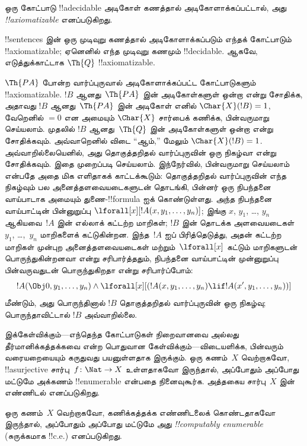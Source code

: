 \documentclass[../../../include/open-logic-section]{subfiles}
\begin{document}
\begin{defn}
ஒரு கோட்பாடு !!a{decidable} அடிகோள் கணத்தால் அடிகோளாக்கப்பட்டால், அது
\emph{!!{axiomatizable}} எனப்படுகிறது.
\end{defn}

\begin{ex}
!!{sentence}s இன் ஒரு முடிவுறு கணத்தால் அடிகோளாக்கப்படும் எந்தக் கோட்பாடும்
!!{axiomatizable}; ஏனெனில் எந்த முடிவுறு கணமும் !!{decidable}. ஆகவே,
எடுத்துக்காட்டாக $\Th{Q}$ !!{axiomatizable}.

$\Th{PA}$ போன்ற வார்ப்புருவால் அடிகோளாக்கப்பட்ட கோட்பாடுகளும்
!!{axiomatizable}. $!B$ ஆனது~$\Th{PA}$ இன் அடிகோள்களுள் ஒன்றா என்று
சோதிக்க, அதாவது $!B$ ஆனது~$\Th{PA}$ இன் அடிகோள் எனில்
$\Char{X}(!B) = 1$, வேறெனில் $= 0$ என அமையும் $\Char{X}$ சார்பைக்
கணிக்க, பின்வருமாறு செய்யலாம். முதலில் $!B$ ஆனது~$\Th{Q}$ இன்
அடிகோள்களுள் ஒன்றா என்று சோதிக்கவும். அவ்வாறெனில் விடை ``ஆம்,'' மேலும்
$\Char{X}(!B) = 1$. அவ்வாறில்லையெனில், அது தொகுத்தறிதல் வார்ப்புருவின்
ஒரு நிகழ்வா என்று சோதிக்கவும். இதை முறைப்படி செய்யலாம். இந்நேர்வில்,
பின்வருமாறு செய்யலாம் என்பதே அதை மிக எளிதாகக் காட்டக்கூடும்: தொகுத்தறிதல்
வார்ப்புருவின் எந்த நிகழ்வும் பல அனைத்தளவையடைகளுடன் தொடங்கி, பின்னர் ஒரு
நிபந்தனை வாய்பாடாக அமையும் துணை-!!{formula} ஐக் கொண்டுள்ளது. அந்த நிபந்தனை
வாய்பாட்டின் பின்னுறுப்பு $\lforall[x][!A(x, y_1, \dots, y_n)]$; இங்கு
$x$, $y_1$, \dots, $y_n$ ஆகியவை~$!A$ இன் எல்லாக் கட்டற்ற மாறிகள்;
$!B$ இன் தொடக்க அளவையடைகள்~$y_1$, \dots,~$y_n$ மாறிகளைக் கட்டுகின்றன.
இந்த~$!A$ ஐப் பிரித்தெடுத்து, அதன் கட்டற்ற மாறிகள் முன்புற அனைத்தளவையடைகள்
மற்றும்~$\lforall[x]$ கட்டும் மாறிகளுடன் பொருந்துகின்றனவா என்று
சரிபார்த்ததும், நிபந்தனை வாய்பாட்டின் முன்னுறுப்பு பின்வருவதுடன் பொருந்துகிறதா
என்று சரிபார்ப்போம்:
\[
!A(\Obj 0, y_1, \dots, y_n) \land \lforall[x][(!A(x, y_1, \dots, y_n)
\lif !A(x', y_1, \dots, y_n))]
\]
மீண்டும், அது பொருந்தினால் $!B$ தொகுத்தறிதல் வார்ப்புருவின் ஒரு நிகழ்வு;
பொருந்தாவிட்டால் $!B$ அவ்வாறில்லை.
\end{ex}

இக்கேள்விக்கும்---எந்தெந்த கோட்பாடுகள் நிறைவானவை அல்லது தீர்மானிக்கத்தக்கவை
என்ற பொதுவான கேள்விக்கும்---விடையளிக்க, பின்வரும் வரையறையையும் கருதுவது
பயனுள்ளதாக இருக்கும். ஒரு கணம்~$X$ வெற்றாகவோ, !!a{surjective}
சார்பு~$f \colon \Nat \to X$ உள்ளதாகவோ இருந்தால், அப்போதும் அப்போது
மட்டுமே அக்கணம் !!{enumerable} என்பதை நினைவுகூர்க. அத்தகைய சார்பு~$X$ இன்
எண்ணிடல் எனப்படுகிறது.

\begin{defn}
ஒரு கணம்~$X$ வெற்றாகவோ, கணிக்கத்தக்க எண்ணிடலைக் கொண்டதாகவோ இருந்தால்,
அப்போதும் அப்போது மட்டுமே அது \emph{!!{computably enumerable}}
(சுருக்கமாக !!{c.e.}) எனப்படுகிறது.
\end{defn}
\end{document}
